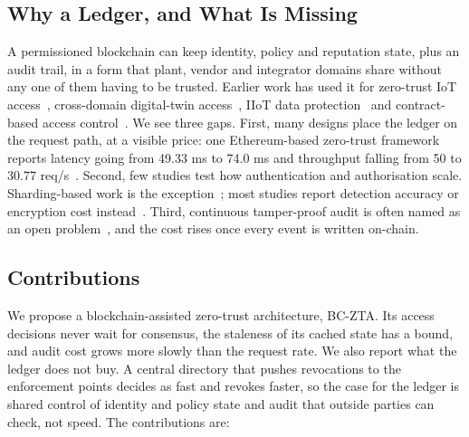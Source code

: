 \documentclass[a4paper,5p,times,twocolumn,number,sort&compress]{elsarticle}
\begin{document}
\subsection{Why a Ledger, and What Is Missing}

A permissioned blockchain can keep identity, policy and reputation state, plus an audit trail, in a form that plant, vendor and integrator domains share without any one of them having to be trusted. Earlier work has used it for zero-trust IoT access~\cite{aleisa,nie}, cross-domain digital-twin access~\cite{ali}, IIoT data protection~\cite{essaid} and contract-based access control~\cite{li_hyper}. We see three gaps. First, many designs place the ledger on the request path, at a visible price: one Ethereum-based zero-trust framework reports latency going from 49.33 ms to 74.0 ms and throughput falling from 50 to 30.77 req/s~\cite{singh}. Second, few studies test how authentication and authorisation scale. Sharding-based work is the exception~\cite{salim}; most studies report detection accuracy or encryption cost instead~\cite{sharma}. Third, continuous tamper-proof audit is often named as an open problem~\cite{mushtaq}, and the cost rises once every event is written on-chain.

\subsection{Contributions}

We propose a blockchain-assisted zero-trust architecture, BC-ZTA. Its access decisions never wait for consensus, the staleness of its cached state has a bound, and audit cost grows more slowly than the request rate. We also report what the ledger does not buy. A central directory that pushes revocations to the enforcement points decides as fast and revokes faster, so the case for the ledger is shared control of identity and policy state and audit that outside parties can check, not speed. The contributions are:
\end{document}

